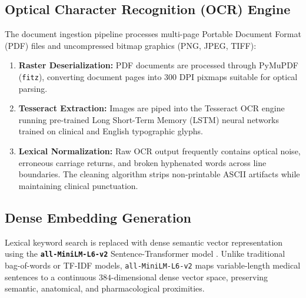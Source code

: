 \documentclass[conference]{IEEEtran}
\begin{document}
\subsection{Optical Character Recognition (OCR) Engine}
The document ingestion pipeline processes multi-page Portable Document Format (PDF) files and uncompressed bitmap graphics (PNG, JPEG, TIFF):
\begin{enumerate}
    \item \textbf{Raster Deserialization:} PDF documents are processed through PyMuPDF (\texttt{fitz}), converting document pages into 300 DPI pixmaps suitable for optical parsing.
    \item \textbf{Tesseract Extraction:} Images are piped into the Tesseract OCR engine \cite{smith2007overview} running pre-trained Long Short-Term Memory (LSTM) neural networks trained on clinical and English typographic glyphs.
    \item \textbf{Lexical Normalization:} Raw OCR output frequently contains optical noise, erroneous carriage returns, and broken hyphenated words across line boundaries. The cleaning algorithm strips non-printable ASCII artifacts while maintaining clinical punctuation.
\end{enumerate}

\subsection{Dense Embedding Generation}
Lexical keyword search is replaced with dense semantic vector representation using the \textbf{\texttt{all-MiniLM-L6-v2}} Sentence-Transformer model \cite{reimers2019sentence}. Unlike traditional bag-of-words or TF-IDF models, \texttt{all-MiniLM-L6-v2} maps variable-length medical sentences to a continuous $384$-dimensional dense vector space, preserving semantic, anatomical, and pharmacological proximities.
\end{document}
